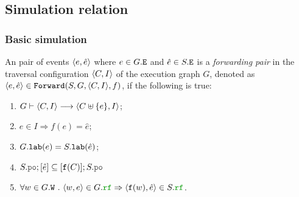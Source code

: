 \documentclass[12pt]{article}
\begin{document}
\subsection{Simulation relation}

\subsubsection{Basic simulation}

\begin{definition}
  An pair of events $\langle e, \hat{e} \rangle$ where $e \in G.{\mathtt{E}}$ and $\hat{e} \in S.{\mathtt{E}}$
  is a \emph{forwarding pair} in
  the traversal configuration $\langle C, I \rangle$ of the \imm execution graph $G$,
  denoted as $\langle e, \hat{e} \rangle \in {\mathtt{Forward}}(S, G, \langle C, I \rangle, f)$, if the following is true:
  \begin{enumerate}[label=\textbf{F.\arabic*}]

    \item \label{item:frwd-coverable}
      $G \vdash \langle C, I \rangle \longrightarrow \langle C \uplus \{e\}, I \rangle$;
    
    \item \label{item:frwd-issued}
      $e \in I \Rightarrow f(e) = \hat{e}$;

    \item \label{item:frwd-lab}
      $G.{\mathtt{lab}}(e) = S.{\mathtt{lab}}(\hat{e})$;

    \item \label{item:frwd-front}
      $S.\lPO;[\hat{e}] \subseteq [\lf(C)];S.\lPO$

    \item \label{item:frwd-rf}
      $\forall{w \in G.\lW} ~.~ \tup{w, e} \in G.\lRF \Rightarrow \tup{\lf(w), \hat{e}} \in S.\lRF$.

  \end{enumerate}
\end{definition}
\end{document}
